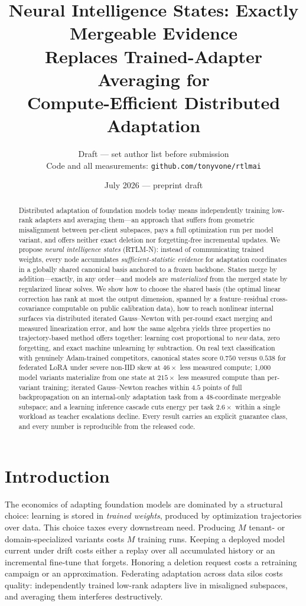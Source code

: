 \documentclass[11pt]{article}
\title{Neural Intelligence States: Exactly Mergeable Evidence\\
Replaces Trained-Adapter Averaging for\\
Compute-Efficient Distributed Adaptation}
\author{Draft --- set author list before submission\\
\small Code and all measurements: \texttt{github.com/tonyvone/rtlmai}}
\date{July 2026 --- preprint draft}
\begin{document}
\maketitle

\begin{abstract}
Distributed adaptation of foundation models today means independently
training low-rank adapters and averaging them---an approach that suffers
from geometric misalignment between per-client subspaces, pays a full
optimization run per model variant, and offers neither exact deletion nor
forgetting-free incremental updates. We propose \emph{neural intelligence
states} (RTLM-N): instead of communicating trained weights, every node
accumulates \emph{sufficient-statistic evidence} for adaptation
coordinates in a globally shared canonical basis anchored to a frozen
backbone. States merge by addition---exactly, in any order---and models
are \emph{materialized} from the merged state by regularized linear
solves. We show how to choose the shared basis (the optimal linear
correction has rank at most the output dimension, spanned by a
feature--residual cross-covariance computable on public calibration
data), how to reach nonlinear internal surfaces via distributed iterated
Gauss--Newton with per-round exact merging and measured linearization
error, and how the same algebra yields three properties no
trajectory-based method offers together: learning cost proportional to
\emph{new} data, zero forgetting, and exact machine unlearning by
subtraction. On real text classification with genuinely Adam-trained
competitors, canonical states score $0.750$ versus $0.538$ for federated
LoRA under severe non-IID skew at $46\times$ less measured compute;
1{,}000 model variants materialize from one state at $215\times$ less
measured compute than per-variant training; iterated Gauss--Newton
reaches within $4.5$ points of full backpropagation on an internal-only
adaptation task from a $48$-coordinate mergeable subspace; and a learning
inference cascade cuts energy per task $2.6\times$ within a single
workload as teacher escalations decline. Every result carries an explicit
guarantee class, and every number is reproducible from the released code.
\end{abstract}

\section{Introduction}

The economics of adapting foundation models are dominated by a structural
choice: learning is stored in \emph{trained weights}, produced by
optimization trajectories over data. This choice taxes every downstream
need. Producing $M$ tenant- or domain-specialized variants costs $M$
training runs. Keeping a deployed model current under drift costs either
a replay over all accumulated history or an incremental fine-tune that
forgets. Honoring a deletion request costs a retraining campaign or an
approximation. Federating adaptation across data silos costs quality:
independently trained low-rank adapters live in misaligned subspaces, and
averaging them interferes destructively.
\end{document}
